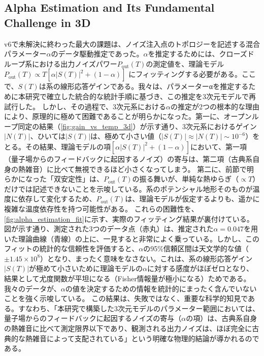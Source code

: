 \documentclass[a4paper,11pt,ja=standard,lualatex]{bxjsarticle}
\newcommand{\figref}[1]{\cref{#1}}
\begin{document}
\subsection{Alpha Estimation and Its Fundamental Challenge in 3D}
\label{subsec:alpha}
v6で未解決に終わった最大の課題は、ノイズ注入点のトポロジーを記述する混合パラメーター$\alpha$のデータ駆動推定であった。$\alpha$を推定するためには、クローズドループ系における出力ノイズパワー$P_{\mathrm{out}}(T)$の測定値を、理論モデル $P_{\mathrm{out}}(T) \propto T[\alpha|S(T)|^2 + (1-\alpha)]$ にフィッティングする必要がある。ここで、$S(T)$は系の線形応答ゲインである。我々は、パラメーターαを推定するために本研究で確立した統合的な統計手順に基づき、この推定を3次元モデルで再試行した。
しかし、その過程で、3次元系における$\alpha$の推定が2つの根本的な理由により、原理的に極めて困難であることが明らかになった。第一に、オープンループ同定の結果（\figref{fig:gain_vs_temp_3d}）が示す通り、3次元系におけるゲイン$|N(T)|$、ひいては$|S(T)|$は、極めて小さい値（$|S(T)| \approx |N(T)| \sim 10^{-6}$）をとる。その結果、理論モデルの項$[\alpha|S(T)|^2 + (1-\alpha)]$において、第一項（量子場からのフィードバックに起因するノイズ）の寄与は、第二項（古典系自身の熱雑音）に比べて無視できるほど小さくなってしまう。
第二に、前節で明らかになった「\mbox{双安定}性」は、$P_{\mathrm{out}}(T)$の振る舞いが、単純な熱ゆらぎ（$\propto T$）だけでは記述できないことを示唆している。系のポテンシャル地形そのものが温度に依存して変化するため、$P_{\mathrm{out}}(T)$は、理論モデルが仮定するよりも、遥かに複雑な温度依存性を持つ可能性がある。
これらの困難性を、\figref{fig:alpha_estimation_fit}に示す、実際のフィッティング結果が裏付けている。図が示す通り、測定された3つのデータ点（赤丸）は、推定された$\alpha=0.047$を用いた理論曲線（青線）の上に、一見すると非常によく乗っている。しかし、このフィットの統計的な信頼性を評価すると、$\alpha$の95\%信頼区間は天文学的な値（$\pm 1.45 \times 10^8$）となり、まったく意味をなさない。これは、系の線形応答ゲイン$|S(T)|$が極めて小さいために理論モデルの$\alpha$に対する感度がほぼゼロとなり、結果として尤度関数が平坦になる（Fisher情報量が極小になる）ためである。我々のデータが、$\alpha$の値を決定するための情報を統計的にまったく含んでいないことを強く示唆している。
この結果は、失敗ではなく、重要な科学的知見である。すなわち、「本研究で構築した3次元モデルのパラメーター範囲においては、量子場からのフィードバックに起因するノイズの寄与（$\alpha$の項）は、古典系自身の熱雑音に比べて測定限界以下であり、観測される出力ノイズは、ほぼ完全に古典的な熱雑音によって支配されている」という明確な物理的結論が導かれるのである。
\end{document}
